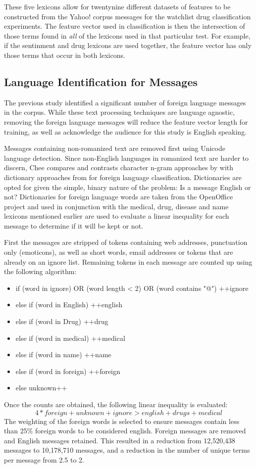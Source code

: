 \documentclass[twoside,11pt]{article}
\begin{document}
These five lexicons allow for twentynine different datasets of features to be constructed from the Yahoo! corpus messages for the watchlist drug classification experiments. The feature vector used in classification is then the intersection of those terms found in \textit{all} of the lexicons used in that particular test. For example, if the sentinment and drug lexicons are used together, the feature vector has only those terms that occur in both lexicons.


\subsection{Language Identification for Messages}
The previous study identified a significant number of foreign language messages in the corpus. While these text processing techniques are language agnostic, removing the foreign language messages will reduce the feature vector length for training, as well as acknowledge the audience for this study is English speaking.

Messages containing non-romanized text are removed first using Unicode language detection. Since non-English languages in romanized text are harder to discern, Chee compares and contrasts character n-gram approaches by \citep{Dunning, 1994} with dictionary approaches from \citep{Rehurek and Kolkus} for foreign language classification. Dictionaries are opted for given the simple, binary nature of the problem: Is a message English or not? Dictionaries for foreign language words are taken from the OpenOffice project and used in conjunction with the medical, drug, disease and name lexicons mentioned earlier are used to evaluate a linear inequality for each message to determine if it will be kept or not.

First the messages are stripped of tokens containing web addresses, punctuation only (emoticons), as well as short words, email addresses or tokens that are already on an ignore list. Remaining tokens in each message are counted up using the following algorithm:
\begin{itemize}
  \item if (word in ignore) OR (word length < 2) OR (word contains "@") ++ignore
  \item else if (word in English) ++english
  \item else if (word in Drug) ++drug
  \item else if (word in medical) ++medical
  \item else if (word in name) ++name
  \item else if (word in foreign) ++foreign
  \item else unknown++
\end{itemize}
Once the counts are obtained, the following linear inequality is evaluated:
\[
  4 * foreign + unknown + ignore > english + drugs + medical
\]
The weighting of the foreign words is selected to ensure messages contain less than 25\% foreign words to be considered english. Foreign messages are removed and English messages retained.  This resulted in a reduction from 12,520,438 messages to 10,178,710 messages, and a reduction in the number of unique terms per message from 2.5 to 2.
\end{document}
